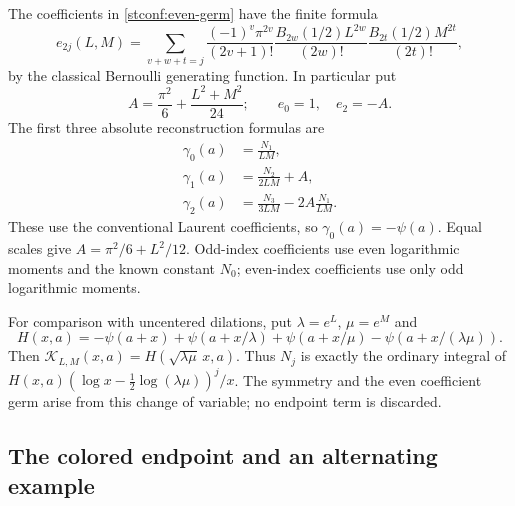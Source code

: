 The coefficients in \eqref{stconf:even-germ} have the finite formula
\begin{equation}\label{stconf:coefficient}
 e_{2j}(L,M)=
 \sum_{v+w+t=j}
 \frac{(-1)^v\pi^{2v}}{(2v+1)!}
 \frac{B_{2w}(1/2)L^{2w}}{(2w)!}
 \frac{B_{2t}(1/2)M^{2t}}{(2t)!},
\end{equation}
by the classical Bernoulli generating function. In particular put
\[
 A=\frac{\pi^2}{6}+\frac{L^2+M^2}{24};
 \qquad e_0=1,\quad e_2=-A.
\]
The first three absolute reconstruction formulas are
\begin{align}
 \gamma_0(a)&=\frac{N_1}{LM},\label{stconf:gamma0}\\
 \gamma_1(a)&=\frac{N_2}{2LM}+A,\label{stconf:gamma1}\\
 \gamma_2(a)&=\frac{N_3}{3LM}-2A\frac{N_1}{LM}.
                   \label{stconf:gamma2}
\end{align}
These use the conventional Laurent coefficients, so
$\gamma_0(a)=-\psi(a)$. Equal scales give
$A=\pi^2/6+L^2/12$. Odd-index coefficients use even logarithmic
moments and the known constant $N_0$; even-index coefficients use
only odd logarithmic moments.

For comparison with uncentered dilations, put $\lambda=e^L$,
$\mu=e^M$ and
\[
 H(x,a)=-\psi(a+x)+\psi(a+x/\lambda)+\psi(a+x/\mu)
                             -\psi(a+x/(\lambda\mu)).
\]
Then $\mathcal K_{L,M}(x,a)=H(\sqrt{\lambda\mu}\,x,a)$.
Thus $N_j$ is exactly the ordinary integral of
$H(x,a)(\log x-\tfrac12\log(\lambda\mu))^j/x$.
The symmetry and the even coefficient germ arise from this change
of variable; no endpoint term is discarded.

\subsection{The colored endpoint and an alternating example}

